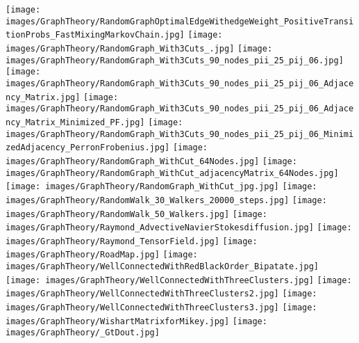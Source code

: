 \texttt{[image: images/GraphTheory/RandomGraphOptimalEdgeWithedgeWeight\_PositiveTransitionProbs\_FastMixingMarkovChain.jpg]}
\texttt{[image: images/GraphTheory/RandomGraph\_With3Cuts\_.jpg]}
\texttt{[image: images/GraphTheory/RandomGraph\_With3Cuts\_90\_nodes\_pii\_25\_pij\_06.jpg]}
\texttt{[image: images/GraphTheory/RandomGraph\_With3Cuts\_90\_nodes\_pii\_25\_pij\_06\_Adjacency\_Matrix.jpg]}
\texttt{[image: images/GraphTheory/RandomGraph\_With3Cuts\_90\_nodes\_pii\_25\_pij\_06\_Adjacency\_Matrix\_Minimized\_PF.jpg]}
\texttt{[image: images/GraphTheory/RandomGraph\_With3Cuts\_90\_nodes\_pii\_25\_pij\_06\_MinimizedAdjacency\_PerronFrobenius.jpg]}
\texttt{[image: images/GraphTheory/RandomGraph\_WithCut\_64Nodes.jpg]}
\texttt{[image: images/GraphTheory/RandomGraph\_WithCut\_adjacencyMatrix\_64Nodes.jpg]}
\texttt{[image: images/GraphTheory/RandomGraph\_WithCut\_jpg.jpg]}
\texttt{[image: images/GraphTheory/RandomWalk\_30\_Walkers\_20000\_steps.jpg]}
\texttt{[image: images/GraphTheory/RandomWalk\_50\_Walkers.jpg]}
\texttt{[image: images/GraphTheory/Raymond\_AdvectiveNavierStokesdiffusion.jpg]}
\texttt{[image: images/GraphTheory/Raymond\_TensorField.jpg]}
\texttt{[image: images/GraphTheory/RoadMap.jpg]}
\texttt{[image: images/GraphTheory/WellConnectedWithRedBlackOrder\_Bipatate.jpg]}
\texttt{[image: images/GraphTheory/WellConnectedWithThreeClusters.jpg]}
\texttt{[image: images/GraphTheory/WellConnectedWithThreeClusters2.jpg]}
\texttt{[image: images/GraphTheory/WellConnectedWithThreeClusters3.jpg]}
\texttt{[image: images/GraphTheory/WishartMatrixforMikey.jpg]}
\texttt{[image: images/GraphTheory/\_GtDout.jpg]}

